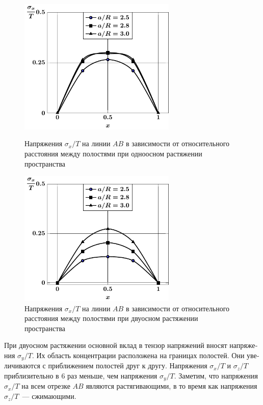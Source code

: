\begin{russian}
\begin{figure}[h!]
\centering\footnotesize
\parbox[b]{7.5cm}{\centering\includegraphics[width=7.5cm]{cav4-a-d95-t1-sig_x.pdf}
\caption{Напряжения $\sigma_x/T$ на линии $AB$ в зависимости от относительного расстояния между полостями при одноосном растяжении пространства
\label{f:8:101}}}\hfil\hfil
\parbox[b]{7.5cm}{\centering\includegraphics[width=7.5cm]{cav4-a-d95-t2-sig_x.pdf}
\caption{Напряжения $\sigma_x/T$ на линии $AB$ в зависимости от относительного расстояния между полостями при двуосном растяжении пространства
\label{f:8:102}}}
\end{figure}

При двуосном растяжении основной вклад в тензор напряжений вносят напряжения $\sigma_y/T$. Их область концентрации расположена на границах полостей. Они увеличиваются с приближением полостей друг к другу. Напряжения $\sigma_x/T$ и $\sigma_z/T$ приблизительно в 6 раз меньше, чем напряжения $\sigma_y/T$. Заметим, что  напряжения $\sigma_x/T$ на всем отрезке $AB$ являются растягивающими, в то время как  напряжения $\sigma_z/T$~--- сжимающими.


\end{russian}
